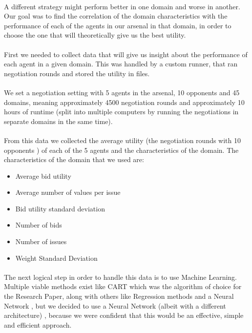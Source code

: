 \paragraph{}
A different strategy might perform better in one domain and worse in another.
Our goal was to find the correlation of the domain characteristics with the performance of each of the agents in our arsenal in that domain, in order to choose the one that will theoretically give us the best utility. 

\paragraph{}
 First we needed to collect data that will give us insight about the performance of each agent in a given domain. 
 This was handled by a custom runner, that ran negotiation rounds and stored the utility in files.
 \paragraph{}
 We set a negotiation setting with 5 agents in the arsenal, 10 opponents and 45 domains, meaning approximately 4500 negotiation rounds and approximately
10 hours of runtime (split into multiple computers by running the negotiations in separate domains in the same time).
\paragraph{}
 From this data we collected the average utility (the negotiation rounds with 10 opponents ) of each of the 5 agents and the characteristics of the domain. 
 The characteristics of the domain that we used are:
\begin{itemize}
	\item {Average bid utility} 
	\item {Average number of values per issue}
	\item {Bid utility standard deviation}
	\item {Number of bids}
	\item {Number of issues}
	\item {Weight Standard Deviation}
  
\end{itemize}

\paragraph{}
 The next logical step in order to handle this data is to use Machine Learning. Multiple viable methods exist 
 like CART which was the algorithm of choice for the Research Paper, along with others like Regression methods and a Neural Network , 
 but we decided to use a Neural Network (albeit with a different architecture) , because we were confident that this would be an effective, simple and efficient approach. 
